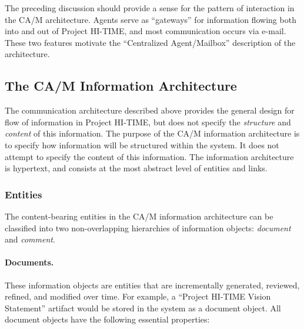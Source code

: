 The preceding discussion should provide a sense for the pattern of 
interaction in the CA/M architecture.  Agents serve as ``gateways'' for
information flowing both into and out of Project HI-TIME, and most
communication occurs via e-mail.  These two features motivate the 
``Centralized Agent/Mailbox'' description of the architecture. 

\subsection{The CA/M Information Architecture}

The communication architecture described above provides the general design
for flow of information in Project HI-TIME, but does not specify the {\em
structure} and {\em content} of this information.  The purpose of the CA/M
information architecture is to specify how information will be structured
within the system. It does not attempt to specify the content of this
information.  The information architecture is hypertext, and consists
at the most abstract level of entities and links.

\subsubsection{Entities}

The content-bearing entities in the CA/M information architecture can be
classified into 
two non-overlapping hierarchies of information objects: {\em document\/}
and {\em comment\/}.  

\paragraph{Documents.}
These information objects are entities that are incrementally generated,
reviewed, refined, and modified over time.  For example, a ``Project
HI-TIME Vision Statement'' artifact would be stored in the system as a document
object.  All document objects have the following essential properties:

